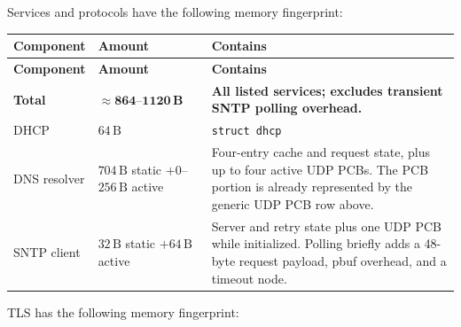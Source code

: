 \documentclass[titlepage]{report}
\begin{document}
			Services and protocols have the following memory fingerprint:

			\begin{xltabular}{\textwidth}{@{}
				>{\raggedright\arraybackslash}X
				>{\raggedright\arraybackslash}X
				>{\raggedright\arraybackslash}X@{}}
				\toprule
				\textbf{Component} & \textbf{Amount} & \textbf{Contains} \\
				\midrule
				\endfirsthead
				\toprule
				\textbf{Component} & \textbf{Amount} & \textbf{Contains} \\
				\midrule
				\endhead
				\bottomrule
				\endfoot
				\midrule
				\textbf{Total} & $\boldsymbol{\approx 864\text{--}1120\,\text{B}}$ & \textbf{All listed services; excludes transient SNTP polling overhead.} \\
				\bottomrule
				\endlastfoot
				DHCP & $64\,\text{B}$ & \texttt{struct dhcp} \\
				DNS resolver & $704\,\text{B}$ static $+ 0$--$256\,\text{B}$ active & Four-entry cache and request state, plus up to four active UDP PCBs. The PCB portion is already represented by the generic UDP PCB row above. \\
				SNTP client & $32\,\text{B}$ static $+ 64\,\text{B}$ active & Server and retry state plus one UDP PCB while initialized. Polling briefly adds a 48-byte request payload, pbuf overhead, and a timeout node. \\
			\end{xltabular}

			TLS has the following memory fingerprint:
\end{document}
